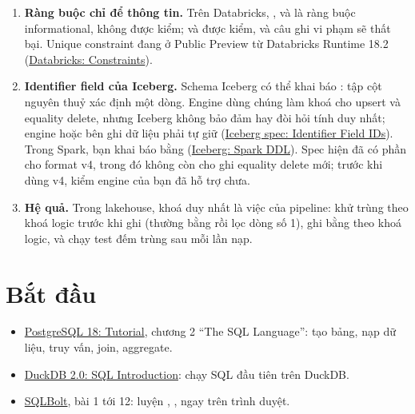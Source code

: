 \begin{enumerate}[resume]
  \item \textbf{Ràng buộc chỉ để thông tin.} Trên Databricks, ,  và  là ràng buộc informational, không được kiểm;  và  được kiểm, và câu ghi vi phạm sẽ thất bại. Unique constraint đang ở Public Preview từ Databricks Runtime 18.2 (\href{https://docs.databricks.com/aws/en/tables/constraints}{Databricks: Constraints}).
  \item \textbf{Identifier field của Iceberg.} Schema Iceberg có thể khai báo : tập cột nguyên thuỷ xác định một dòng. Engine dùng chúng làm khoá cho upsert và equality delete, nhưng Iceberg không bảo đảm hay đòi hỏi tính duy nhất; engine hoặc bên ghi dữ liệu phải tự giữ (\href{https://iceberg.apache.org/spec/\#identifier-field-ids}{Iceberg spec: Identifier Field IDs}). Trong Spark, bạn khai báo bằng  (\href{https://iceberg.apache.org/docs/latest/spark-ddl/\#alter-table-set-identifier-fields}{Iceberg: Spark DDL}). Spec hiện đã có phần cho format v4, trong đó không còn cho ghi equality delete mới; trước khi dùng v4, kiểm engine của bạn đã hỗ trợ chưa.
  \item \textbf{Hệ quả.} Trong lakehouse, khoá duy nhất là việc của pipeline: khử trùng theo khoá logic trước khi ghi (thường bằng  rồi lọc dòng số 1), ghi bằng  theo khoá logic, và chạy test đếm trùng sau mỗi lần nạp.
\end{enumerate}

\section{Bắt đầu}

\begin{itemize}
  \item \href{https://www.postgresql.org/docs/current/tutorial.html}{PostgreSQL 18: Tutorial}, chương 2 “The SQL Language”: tạo bảng, nạp dữ liệu, truy vấn, join, aggregate.
  \item \href{https://duckdb.org/docs/2.0/sql/introduction}{DuckDB 2.0: SQL Introduction}: chạy SQL đầu tiên trên DuckDB.
  \item \href{https://sqlbolt.com/}{SQLBolt}, bài 1 tới 12: luyện , ,  ngay trên trình duyệt.
\end{itemize}

